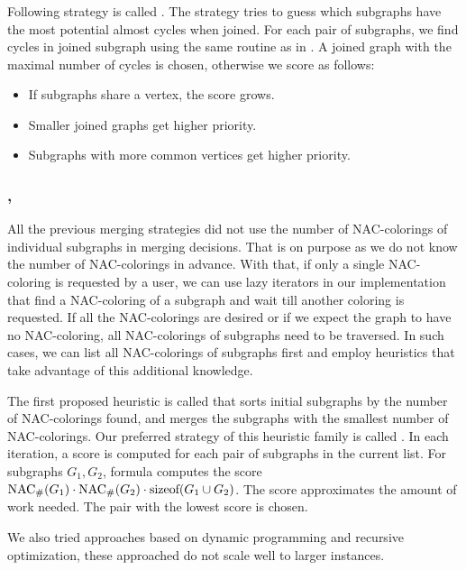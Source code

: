 \subsubsection*{\PromisingCycles{}}

Following strategy is called \PromisingCycles{}.
The strategy tries to guess which subgraphs
have the most potential almost cycles when joined.
For each pair of subgraphs, we find cycles in joined subgraph using
the same routine as in .
A joined graph with the maximal number of cycles is chosen,
otherwise we score as follows:
%
\begin{itemize}
	\item If subgraphs share a vertex, the score grows.
	\item Smaller joined graphs get higher priority.
	\item Subgraphs with more common vertices get higher priority.
\end{itemize}
%

\subsubsection*{\SortedSize{}, \Score{}}

All the previous merging strategies did not use the number of NAC-colorings
of individual subgraphs in merging decisions.
That is on purpose as we do not know the number of NAC-colorings in advance.
With that, if only a single NAC-coloring is requested by a user,
we can use lazy iterators in our implementation that
find a NAC-coloring of a subgraph and wait till another coloring is requested.
If all the NAC-colorings are desired or if we expect the graph to have no NAC-coloring,
all NAC-colorings of subgraphs need to be traversed.
In such cases, we can list all NAC-colorings of subgraphs first
and employ heuristics that take advantage of this additional knowledge.

The first proposed heuristic is called \SortedSize{}
that sorts initial subgraphs by the number of NAC-colorings found,
and merges the subgraphs with the smallest number of NAC-colorings.
%
Our preferred strategy of this heuristic family is called \Score{}.
In each iteration, a score is computed for each pair of subgraphs in the current list.
For subgraphs \( G_1, G_2 \), formula computes the score
\( \operatorname{NAC}_{\#} (G_1) \cdot \operatorname{NAC}_{\#} (G_2) \cdot \text{sizeof}(G_1 \cup G_2) \).
The score approximates the amount of work needed.
The pair with the lowest score is chosen.

We also tried approaches based on dynamic programming and recursive optimization,
these approached do not scale well to larger instances.

